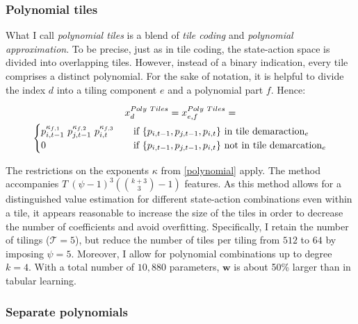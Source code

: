 \subsubsection{Polynomial tiles}

What I call \emph{polynomial tiles} is a blend of \emph{tile coding} and \emph{polynomial approximation}. To be precise, just as in tile coding, the state-action space is divided into overlapping tiles. However, instead of a binary indication, every tile comprises a distinct polynomial. For the sake of notation, it is helpful to divide the index $d$ into a tiling component $e$ and a polynomial part $f$. Hence:

\begin{gather}\label{poly_tiling_extraction}
x_d^{Poly~Tiles} = x_{e,f}^{Poly~Tiles} = \notag \\
\begin{cases}
p_{i, t-1}^{\kappa_{f,1}} ~ p_{j, t-1}^{\kappa_{f,2}} ~ p_{i, t}^{\kappa_{f,3}} & \quad \text{if } \{p_{i, t-1}, p_{j, t-1}, p_{i, t}\} \text{~in tile demaraction}_e  \\
0 & \quad \text{if } \{p_{i, t-1}, p_{j, t-1}, p_{i, t}\} \text{~not in tile demarcation}_e \\ \end{cases} 
\end{gather}

The restrictions on the exponents $\kappa$ from \autoref{polynomial} apply. The method accompanies $T~(\psi - 1)^3 ({k + 3\choose3}  - 1)$ features. As this method allows for a distinguished value estimation for different state-action combinations even within a tile, it appears reasonable to increase the size of the tiles in order to decrease the number of coefficients and avoid overfitting. Specifically, I retain the number of tilings ($\mathcal{T} = 5$), but reduce the number of tiles per tiling from $512$ to $64$ by imposing $\psi = 5$. Moreover, I allow for polynomial combinations up to degree $k=4$. With a total number of $10,880$ parameters, $\boldsymbol{w}$ is about 50\% larger than in tabular learning.

\subsubsection{Separate polynomials}\label{separate_polys}

